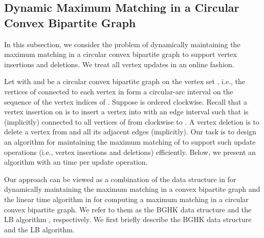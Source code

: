 \documentclass[11pt]{article}
\begin{document}
\subsection{Dynamic Maximum Matching in a Circular Convex Bipartite Graph}

In this subsection, we consider the problem of dynamically maintaining the
maximum matching in a circular convex bipartite graph to support vertex
insertions and deletions. We treat all vertex updates in an online fashion.

Let  with  and  be a circular convex
bipartite graph on the vertex set , i.e., the vertices of 
connected to each vertex in  form a circular-arc interval on the
sequence of the vertex indices of . Suppose
 is ordered clockwise. Recall that a
vertex insertion on  is to insert a vertex  into  with an edge interval
 such that  is (implicitly) connected to all
vertices of  from  clockwise to .
A vertex deletion is to delete a
vertex  from  and all its adjacent edges (implicitly).  Our
task is to design an algorithm for maintaining the maximum matching of
 to support such update operations (i.e., vertex insertions and
deletions) efficiently. Below, we present an algorithm with an  time per
update operation.


Our approach can be viewed as a combination of the data structure in
\cite{ref:BrodalDy07} for dynamically maintaining the maximum
matching in a convex bipartite graph and the linear time algorithm
in \cite{ref:LiangCi95} for computing a maximum matching in a
circular convex bipartite graph. We refer to them as the BGHK data
structure \cite{ref:BrodalDy07} and the LB algorithm
\cite{ref:LiangCi95}, respectively. We first briefly describe
the BGHK data structure and the LB algorithm.
\end{document}
